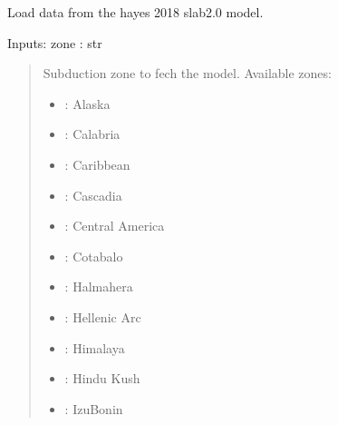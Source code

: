 \documentclass[letterpaper,10pt,english]{sphinxmanual}
\begin{document}
\begin{fulllineitems}
\label{\detokenize{main:main.load_files_slab2}}
\pysigstartsignatures
{}
\pysigstopsignatures
\sphinxAtStartPar
Load data from the hayes 2018 slab2.0 model.

\sphinxAtStartPar
Inputs:
zone : str
\begin{quote}

\sphinxAtStartPar
Subduction zone to fech the model.
Available zones:
\begin{itemize}
\item {} 
\sphinxAtStartPar
{}: Alaska

\item {} 
\sphinxAtStartPar
{}: Calabria

\item {} 
\sphinxAtStartPar
{}: Caribbean

\item {} 
\sphinxAtStartPar
{}: Cascadia

\item {} 
\sphinxAtStartPar
{}: Central America

\item {} 
\sphinxAtStartPar
{}: Cotabalo

\item {} 
\sphinxAtStartPar
{}: Halmahera

\item {} 
\sphinxAtStartPar
{}: Hellenic Arc

\item {} 
\sphinxAtStartPar
{}: Himalaya

\item {} 
\sphinxAtStartPar
{}: Hindu Kush

\item {} 
\sphinxAtStartPar
{}: Izu\sphinxhyphen{}Bonin


\end{itemize}
\end{quote}
\end{fulllineitems}
\end{document}
